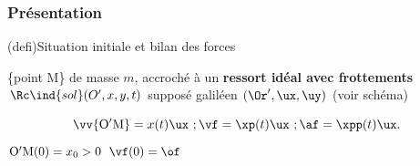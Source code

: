 \documentclass[../../main/main.tex]{subfiles}
\begin{document}
\subsubsection{Présentation}
\begin{tcb}[label=def:ressortlibre, sidebyside](defi){Situation
			initiale et bilan des forces}
	\begin{itemize}[label=$\diamond$, leftmargin=10pt]
		 \{point M\} de masse $m$, accroché à un \textbf{ressort
			idéal avec frottements}
		 $\Rc\ind{sol}(O',x,y,t)$ supposé galiléen
		 $(\Or', \ux, \uy)$ (voir schéma)
		\vspace{-15pt}
		\begin{center}
			\hspace*{-10pt}
		\end{center}
		\[
			\vv{\rm O'M} = x(t)\ux~; \vf = \xp(t)\ux~; \af = \xpp(t)\ux.
		\]
		 ${\rm O'M}(0) = x_0 >0$
		 $\vf(0) = \of$
	\end{itemize}
	\tcblower
	\begin{center}
\end{center}
\end{tcb}
\end{document}
